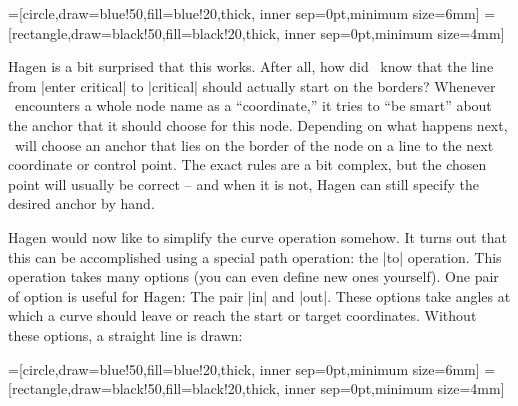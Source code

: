 {
=[circle,draw=blue!50,fill=blue!20,thick,
                   inner sep=0pt,minimum size=6mm]
=[rectangle,draw=black!50,fill=black!20,thick,
                        inner sep=0pt,minimum size=4mm]
\begin{codeexample}[]
\end{codeexample}
}

Hagen is a bit surprised that this works. After all, how did
\tikzname\ know that the line from |enter critical| to |critical|
should actually start on the borders? Whenever \tikzname\ encounters a
whole node name as a ``coordinate,'' it tries to ``be smart'' about
the anchor that it should choose for this node. Depending on what
happens next, \tikzname\ will choose an anchor that lies on the border
of the node on a line to the next coordinate or control point. The
exact rules are a bit complex, but the chosen point will usually be
correct -- and when it is not, Hagen can still specify the desired
anchor by hand.

Hagen would now like to simplify the curve operation somehow. It turns
out that this can be accomplished using a special path operation: the
|to| operation. This operation takes many options (you can even define
new ones yourself). One pair of option is useful for Hagen: The pair
|in| and |out|. These options take angles at which a curve should
leave or reach the start or target coordinates. Without these options,
a straight line is drawn:

{
=[circle,draw=blue!50,fill=blue!20,thick,
                   inner sep=0pt,minimum size=6mm]
=[rectangle,draw=black!50,fill=black!20,thick,
                        inner sep=0pt,minimum size=4mm]
\begin{codeexample}[]
\end{codeexample}
}

